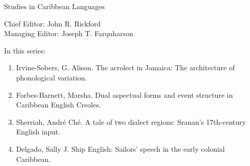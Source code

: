 {\large Studies in Caribbean Languages}

\bigskip

Chief Editor: John R. Rickford\\
Managing Editor: Joseph T. Farquharson

\bigskip

In this series:

\begin{enumerate}
\item Irvine-Sobers,  G. Alison. The acrolect in Jamaica: The architecture of phonological variation.
\item Forbes-Barnett, Marsha. Dual aspectual forms and event structure in Caribbean English Creoles.
\item Sherriah, André Ché. A tale of two dialect regions: Sranan’s 17th-century English input.
\item Delgado, Sally J. Ship English: Sailors’ speech in the early colonial Caribbean.
\end{enumerate}


\vfill

